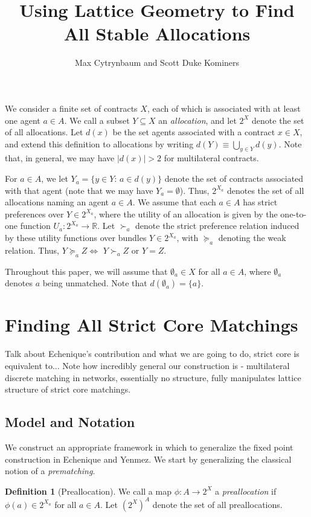 \documentclass[11pt,reqno]{amsart}
\title{Using Lattice Geometry to Find All Stable Allocations}
\author{Max Cytrynbaum and Scott Duke Kominers}
\theoremstyle{definition}
\newtheorem{defn}[thm]{Definition}
\numberwithin{equation}{section}
\newcommand{\mr}{\mathbb{R}}
\newcommand{\pre}{\phi}
\newcommand{\sub}{\subseteq}
\newcommand{\suq}{\succeq}
\newcommand{\su}{\succ}
\begin{document}
\maketitle

We consider a finite set of contracts $X$, each of which is associated with at least one agent $a\in A$. 
We call a subset $Y\sub X$ an \emph{allocation}, and let $2^X$ denote the set of all allocations. 
Let $d(x)$ be the set agents associated with a contract $x\in X$, and extend this definition to allocations by writing $d(Y) \equiv \bigcup_{y\in Y} d(y)$.
Note that, in general, we may have $|d(x)| > 2$ for multilateral contracts.

For $a\in A$, we let $Y_a = \{y\in Y: \, a\in d(y)\}$ denote the set of contracts associated with that agent (note that we may have $Y_a = \emptyset$). Thus, $2^{X_a}$ denotes the set of all allocations naming an agent $a\in A$. 
We assume that each $a\in A$ has strict preferences over $Y \in 2^{X_a}$, where the utility of an allocation is given by the one-to-one function $U_a: 2^{X_a} \to \mr$.
Let $\su_a$ denote the strict preference relation induced by these utility functions over bundles $Y \in 2^{X_a}$, with $\suq_a$ denoting the weak relation. Thus, $Y \suq_a  Z \iff$ $Y \su_a Z$ or $Y = Z$.

Throughout this paper, we will assume that $\emptyset_a \in X$ for all $a \in A$, where $\emptyset_a$ denotes $a$ being unmatched. Note that $d(\emptyset_a) = \{a\}$. 

\section{Finding All Strict Core Matchings} \label{section:strcore}
Talk about Echenique's contribution and what we are going to do, strict core is equivalent to...
Note how incredibly general our construction is - multilateral discrete matching in networks, essentially no structure, fully manipulates lattice structure of strict core matchings.   
\subsection{Model and Notation}
We construct an appropriate framework in which to generalize the fixed point construction in Echenique and Yenmez. 
We start by generalizing the classical notion of a \emph{prematching}. 

\begin{defn}[Preallocation] We call a map $\pre: A \to 2^X$ a \emph{preallocation} if $\pre(a) \in 2^{X_a}$ for all $a\in A$. Let $(2^X)^A$ denote the set of all preallocations.  
\end{defn}
\end{document}
